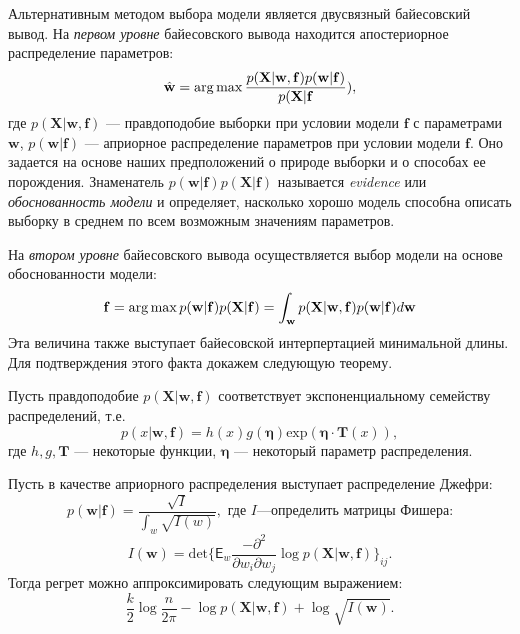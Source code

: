 \documentclass[../main.tex]{subfiles}
\begin{document}
Альтернативным методом выбора модели является двусвязный байесовский вывод.
На \textit{первом уровне} байесовского вывода находится апостериорное распределение параметров:
\begin{equation}
\label{eq:bayes}
    \hat{\mathbf{w}} = \operatorname*{arg\,max} \frac{p(\mathbf{X}|\mathbf{w}, \mathbf{f})p(\mathbf{w}|\mathbf{f})}{p(\mathbf{X}| \mathbf{f}}),
\end{equation}
где $p(\mathbf{X}|\mathbf{w}, \mathbf{f})$ --- правдоподобие выборки при условии модели $\mathbf{f}$ с параметрами $\mathbf{w}$, $p(\mathbf{w}|\mathbf{f})$ --- априорное распределение параметров при условии модели $\mathbf{f}$. Оно задается на основе наших предположений о природе выборки и о способах ее порождения. Знаменатель $p(\mathbf{w}|\mathbf{f})p(\mathbf{X}| \mathbf{f})$ называется \textit{evidence} или \textit{обоснованность модели} и определяет, насколько хорошо модель способна описать выборку в среднем по всем возможным значениям параметров.


На \textit{втором уровне} байесовского вывода осуществляется выбор модели на основе обоснованности модели:
\[
\mathbf{f} = \operatorname*{arg\,max} p(\mathbf{w}|\mathbf{f})p(\mathbf{X}| \mathbf{f}) = \int_{\mathbf{w}} p(\mathbf{X}|\mathbf{w}, \mathbf{f})p(\mathbf{w}|\mathbf{f}) d\mathbf{w}
\]
Эта величина также выступает байесовской интерпертацией минимальной длины. Для подтверждения этого факта докажем следующую теорему.

\begin{theorem}
Пусть правдоподобие $p(\mathbf{X}|\mathbf{w}, \mathbf{f})$ соответствует экспоненциальному семейству распределений, т.е.
\[
    p(x|\mathbf{w}, \mathbf{f}) = h(x)g(\boldsymbol{\eta}) \text{exp}\left(\boldsymbol{\eta} \cdot \mathbf{T}(x)\right),
\]
где $h, g, \mathbf{T}$ --- некоторые функции, $\boldsymbol{\eta}$ --- некоторый параметр распределения.

Пусть в качестве априорного распределения выступает распределение Джефри:
\[
    p(\mathbf{w}|\mathbf{f}) = \frac{\sqrt{I}}{\int_w \sqrt{I(w)}}, \text{ где } I  \text{---определить матрицы Фишера:}    
\]
\[
    I(\mathbf{w}) = \text{det}\{\mathsf{E}_w \frac{-\partial^2}{\partial w_i \partial w_j } \log p(\mathbf{X}|\mathbf{w}, \mathbf{f}) \}_{ij}.
\]
Тогда регрет можно аппроксимировать следующим выражением:
\[
\frac{k}{2}\log{\frac{n}{2\pi}} - \log p(\mathbf{X}|\mathbf{w}, \mathbf{f}) + \log \sqrt{I(\mathbf{w})}.
\]

\end{theorem}
\end{document}
